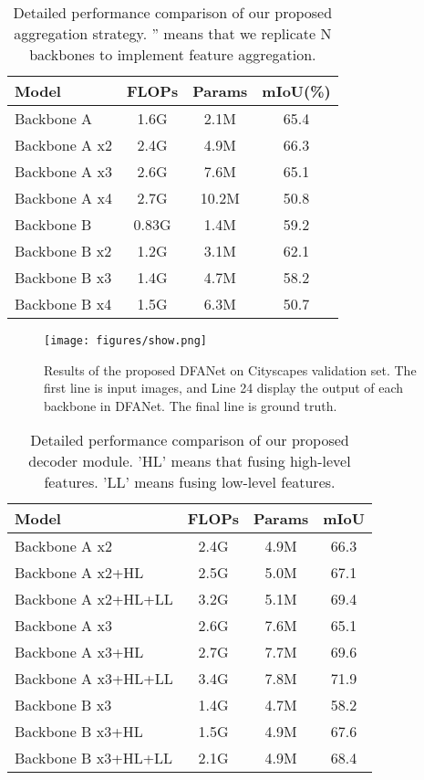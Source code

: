 \documentclass[10pt,twocolumn,letterpaper]{article}
\begin{document}
\begin{table}
\begin{center}
\begin{tabular}{l|c|c|c}
\hline
Model & FLOPs & Params & mIoU(\%) \\
\hline\hline
Backbone A     & 1.6G & 2.1M & 65.4 \\
Backbone A x2  & 2.4G & 4.9M & 66.3 \\
Backbone A x3  & 2.6G & 7.6M & 65.1 \\
Backbone A x4  &2.7G & 10.2M & 50.8 \\
\hline
Backbone B     & 0.83G & 1.4M & 59.2 \\
Backbone B x2  & 1.2G & 3.1M & 62.1 \\
Backbone B x3  & 1.4G & 4.7M & 58.2 \\
Backbone B x4  & 1.5G & 6.3M & 50.7 \\
\hline
\end{tabular}
\end{center}
\caption{Detailed performance comparison of our proposed aggregation strategy. '' means that we replicate N backbones to implement feature aggregation.}
\label{tab: feature aggregate comparison}
\end{table}

\begin{figure}
\begin{center}
   \texttt{[image: figures/show.png]}
\end{center}
   \caption{Results of the proposed DFANet on Cityscapes validation set. The first line is input images, and Line 24 display the output of each backbone in DFANet. The final line is ground truth.}
\label{fig:visual results}
\end{figure}




\begin{table}
\begin{center}
\begin{tabular}{l|c|c|c}
\hline
Model & FLOPs & Params & mIoU \\
\hline\hline
Backbone A x2        & 2.4G & 4.9M & 66.3 \\
Backbone A x2+HL     & 2.5G & 5.0M & 67.1 \\
Backbone A x2+HL+LL  & 3.2G & 5.1M & 69.4 \\
\hline
Backbone A x3        & 2.6G & 7.6M & 65.1 \\
Backbone A x3+HL     & 2.7G & 7.7M & 69.6 \\
Backbone A x3+HL+LL  & 3.4G & 7.8M & 71.9 \\
\hline
Backbone B x3        & 1.4G & 4.7M & 58.2 \\
Backbone B x3+HL     & 1.5G & 4.9M & 67.6 \\
Backbone B x3+HL+LL  & 2.1G & 4.9M & 68.4 \\
\hline
\end{tabular}
\end{center}
\caption{Detailed performance comparison of our proposed decoder module. 'HL' means that fusing high-level features. 'LL' means fusing low-level features.}
\label{tab:decoder results}
\end{table}
\end{document}
